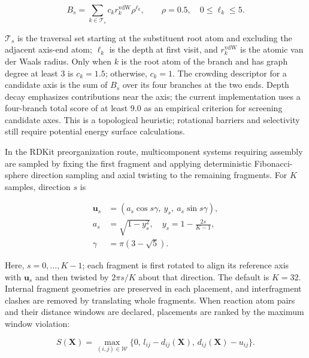 \begin{equation}\label{eq:methods-4}
B_s=\sum_{k\in\mathcal T_s}c_k r_k^{\mathrm{vdW}}\rho^{\ell_k},\qquad
\rho=0.5,\quad 0\leq\ell_k\leq5.
\end{equation}

$\mathcal T_s$ is the traversal set starting at the substituent root atom and excluding the adjacent axis-end atom; $\ell_k$ is the depth at first visit, and $r_k^{\mathrm{vdW}}$ is the atomic van der Waals radius. Only when $k$ is the root atom of the branch and has graph degree at least 3 is $c_k=1.5$; otherwise, $c_k=1$. The crowding descriptor for a candidate axis is the sum of $B_s$ over its four branches at the two ends. Depth decay emphasizes contributions near the axis; the current implementation uses a four-branch total score of at least 9.0 as an empirical criterion for screening candidate axes. This is a topological heuristic; rotational barriers and selectivity still require potential energy surface calculations.

In the RDKit preorganization route, multicomponent systems requiring assembly are sampled by fixing the first fragment and applying deterministic Fibonacci-sphere direction sampling and axial twisting to the remaining fragments. For $K$ samples, direction $s$ is

\begin{equation}\label{eq:methods-5}
\begin{aligned}
\mathbf u_s&=(a_s\cos s\gamma,\ y_s,\ a_s\sin s\gamma),\\
a_s&=\sqrt{1-y_s^2},\quad y_s=1-\frac{2s}{K-1},\\
\gamma&=\pi(3-\sqrt5).
\end{aligned}
\end{equation}

Here, $s=0,\ldots,K-1$; each fragment is first rotated to align its reference axis with $\mathbf u_s$ and then twisted by $2\pi s/K$ about that direction. The default is $K=32$. Internal fragment geometries are preserved in each placement, and interfragment clashes are removed by translating whole fragments. When reaction atom pairs and their distance windows are declared, placements are ranked by the maximum window violation:

\begin{equation}\label{eq:methods-6}
S(\mathbf X)=\max_{(i,j)\in\mathcal W}
\{0,\,l_{ij}-d_{ij}(\mathbf X),\,d_{ij}(\mathbf X)-u_{ij}\}.
\end{equation}

